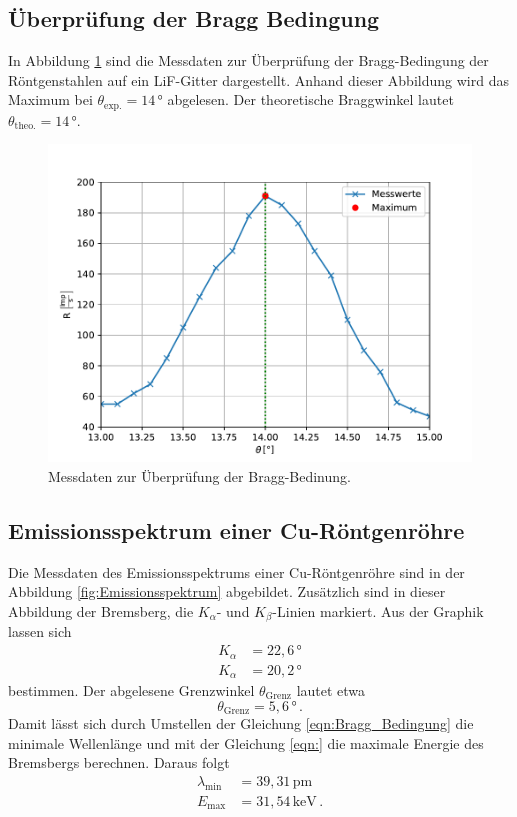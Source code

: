 \subsection{Überprüfung der Bragg Bedingung}
In Abbildung \ref{fig:Bragg} sind die Messdaten zur Überprüfung der
Bragg-Bedingung der Röntgenstahlen auf ein LiF-Gitter dargestellt.
Anhand dieser Abbildung wird das Maximum bei $\theta_{\text{exp.}} = 14\,\unit{\degree}$
abgelesen. Der theoretische Braggwinkel lautet $\theta_{\text{theo.}} = 14\,\unit{\degree}$.
\begin{figure}[H]
  \centering
  \includegraphics{content/Plots/Bragg.pdf}
  \caption{Messdaten zur Überprüfung der Bragg-Bedinung.}
  \label{fig:Bragg}
\end{figure}

\subsection{Emissionsspektrum einer Cu-Röntgenröhre}
Die Messdaten des Emissionsspektrums einer Cu-Röntgenröhre sind in der 
Abbildung \ref{fig:Emissionsspektrum} abgebildet. Zusätzlich sind in dieser
Abbildung der Bremsberg, die $K_{\alpha}$- und $K_{\beta}$-Linien markiert.
Aus der Graphik lassen sich 
\begin{align*}
  K_{\alpha} &= 22,6\,\unit{\degree} \\
  K_{\alpha} &= 20,2\,\unit{\degree}
\end{align*}
bestimmen. Der abgelesene Grenzwinkel $\theta_{\text{Grenz}}$ lautet etwa
$$\theta_{\text{Grenz}} = 5,6\,\unit{\degree}\,.$$ Damit lässt sich durch Umstellen der Gleichung
\ref{eqn:Bragg_Bedingung} die minimale Wellenlänge und mit der Gleichung \ref{eqn:} die maximale Energie des Bremsbergs
berechnen. Daraus folgt
\begin{align*}
  \lambda_{\text{min}} &= 39,31\,\unit{\pico\metre}\\
  E_{\text{max}} &= 31,54\,\unit{\kilo\eV}\,.
\end{align*}

